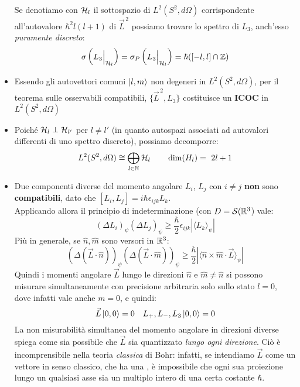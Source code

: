 \documentclass[../../FisicaTeorica.tex]{subfiles}
\begin{document}
\begin{itemize}
Se denotiamo con $\hs_l$ il sottospazio di $L^2(S^2, d\Omega)$ corrispondente all'autovalore $\hbar^2 l(l+1)$ di $\vec{L}^{\,2}$ possiamo trovare lo spettro di $L_3$, anch'esso \textit{puramente discreto}:
\[
\sigma\left(L_3 \Big|_{\hs_l} \right) = \sigma_P\left(L_3 \Big|_{\hs_l}\right) = \hbar([-l,l] \cap \bb{Z})
\]
\item Essendo gli autovettori comuni $\ket{l,m}$ non degeneri in $L^2(S^2, d\Omega)$, per il teorema sulle osservabili compatibili, $\{\vec{L}^{\,2}, L_3\}$ costituisce un \textbf{ICOC} in $L^2(S^2, d\Omega)$
\item Poiché $\hs_l \perp \hs_{l'}$ per $l\neq l'$ (in quanto autospazi associati ad autovalori differenti di uno spettro discreto), possiamo decomporre:
\[
L^2(S^2, d\Omega) \cong \bigoplus_{l\in \bb{N}} \hs_l \qquad \op{dim}(H_l) =\ 2l+1
\]
\item Due componenti diverse del momento angolare $L_i$, $L_j$ con $i\neq j$ \textbf{non} sono \textbf{compatibili}, dato che $[L_i, L_j]=i\hbar \epsilon_{ijk} L_k$.\\
Applicando allora il principio di indeterminazione (con $D=\mathcal{S}(\bb{R}^3$) vale:
\[
(\Delta L_i)_\psi(\Delta L_j)_\psi \geq \frac{\hbar}{2} \epsilon_{ijk} |\langle L_k \rangle_\psi| 
\]
Più in generale, se $\hat{n}, \hat{m}$ sono versori in $\bb{R}^3$:
\[
(\Delta (\vec{L}\cdot \hat{n}))_\psi (\Delta (\vec{L}\cdot \hat{m}))_\psi \geq \frac{\hbar}{2}|\langle \hat{n}\times \hat{m} \cdot \vec{L}\rangle_\psi|
\]
Quindi i momenti angolare $\vec{L}$ lungo le direzioni $\hat{n}$ e $\hat{m}\neq \hat{n}$ si possono misurare simultaneamente con precisione arbitraria solo sullo stato $l=0$, dove infatti vale anche $m=0$, e quindi:
\[
\vec{L}\ket{0,0}=0 \quad L_+, L_-, L_3\ket{0,0}=0
\]
La non misurabilità simultanea del momento angolare in direzioni diverse spiega come sia possibile che $\vec{L}$ sia quantizzato \textit{lungo ogni direzione}. Ciò è incomprensibile nella teoria \textit{classica} di Bohr: infatti, se intendiamo $\vec{L}$ come un vettore in senso classico, che ha una , è impossibile che ogni sua proiezione lungo un qualsiasi asse sia un multiplo intero di una certa costante $\hbar$.
\begin{figure}[H]
\centering


\begin{tikzpicture}[x=0.75pt,y=0.75pt,yscale=-1,xscale=1]


\end{tikzpicture}
\end{figure}
\end{itemize}
\end{document}
